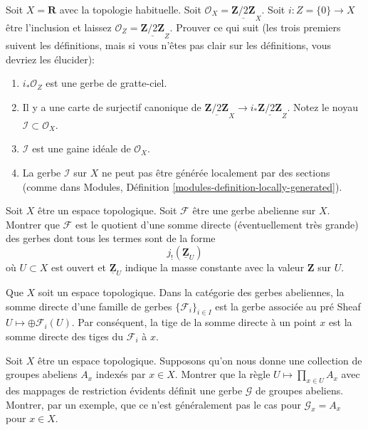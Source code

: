 \begin{exercise}
\label{exercise-not-locally-generated-by-sections}
Soit $X = \mathbf{R}$ avec la topologie
habituelle. Soit $\mathcal{O}_X = \underline{\mathbf{Z}/2\mathbf{Z}}_X$. Soit $i :
Z = \{0\} \to X$ être l'inclusion
et laissez $\mathcal{O}_Z = \underline{\mathbf{Z}/2\mathbf{Z}}_Z$. Prouver ce qui
suit (les trois premiers suivent les définitions, mais si vous n'êtes
pas clair sur les définitions, vous devriez les élucider):
\begin{enumerate}
\item $i_*\mathcal{O}_Z$ est une gerbe de gratte-ciel.
\item Il y a une
carte de surjectif canonique
de $\underline{\mathbf{Z}/2\mathbf{Z}}_X \to i_*\underline{\mathbf{Z}/2\mathbf{Z}}_Z$.
Notez le noyau $\mathcal{I} \subset \mathcal{O}_X$.
\item $\mathcal{I}$ est une gaine idéale de $\mathcal{O}_X$.
\item La gerbe $\mathcal{I}$ sur $X$ ne peut pas
être générée
localement par des sections (comme dans Modules, Définition \ref{modules-definition-locally-generated}).
\end{enumerate}
\end{exercise}

\begin{exercise}
\label{exercise-quotient-j-shriek-Z}
Soit $X$ être un espace topologique.
Soit ${\mathcal F}$ être une gerbe abelienne sur $X$. Montrer
que ${\mathcal F}$ est le quotient d'une somme directe (éventuellement très grande) des
gerbes dont tous les termes sont de la forme
$$
j_{!}(\underline{{\mathbf Z}}_U)
$$
où $U \subset X$ est ouvert et $\underline{{\mathbf Z}}_U$ indique la masse
constante avec la valeur ${\mathbf Z}$ sur $U$.
\end{exercise}

\begin{remark}
\label{remark-direct-sum-stalk-abelian}
Que $X$ soit un espace
topologique. Dans la catégorie des gerbes abeliennes, la somme
directe d'une famille de gerbes $\{{\mathcal F}_i\}_{i\in I}$ est la gerbe associée au pré
Sheaf $U \mapsto \oplus {\mathcal F}_i(U)$. Par conséquent, la tige de la somme
directe à un point $x$ est la somme directe des tiges du
${\mathcal F}_i$ à $x$.
\end{remark}

\begin{exercise}
\label{exercise-product-over-points}
Soit $X$ être un espace topologique. Supposons qu'on nous donne une collection de
groupes abeliens $A_x$ indexés par $x \in X$. Montrer que la
règle $U \mapsto \prod_{x \in U} A_x$ avec des mappages de restriction
évidents définit une gerbe $\mathcal{G}$ de groupes abeliens. Montrer, par un exemple, que
ce n'est généralement pas le cas pour $\mathcal{G}_x = A_x$ pour $x \in X$.
\end{exercise}

